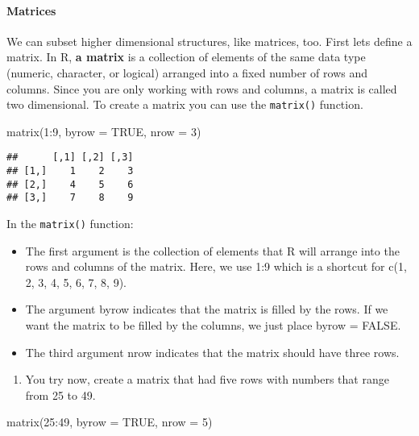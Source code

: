 \documentclass[
]{article}
\newenvironment{Shaded}{\begin{snugshade}}{\end{snugshade}}
\newcommand{\AttributeTok}[1]{\textcolor[rgb]{0.77,0.63,0.00}{#1}}
\newcommand{\ConstantTok}[1]{\textcolor[rgb]{0.00,0.00,0.00}{#1}}
\newcommand{\DecValTok}[1]{\textcolor[rgb]{0.00,0.00,0.81}{#1}}
\newcommand{\FunctionTok}[1]{\textcolor[rgb]{0.00,0.00,0.00}{#1}}
\newcommand{\NormalTok}[1]{#1}
\newcommand{\SpecialCharTok}[1]{\textcolor[rgb]{0.00,0.00,0.00}{#1}}
\providecommand{\tightlist}{%
  \setlength{\itemsep}{0pt}\setlength{\parskip}{0pt}}
\begin{document}
\hypertarget{matrices}{%
\paragraph{Matrices}\label{matrices}}

We can subset higher dimensional structures, like matrices, too. First
lets define a matrix. In R, \textbf{a matrix} is a collection of
elements of the same data type (numeric, character, or logical) arranged
into a fixed number of rows and columns. Since you are only working with
rows and columns, a matrix is called two dimensional. To create a matrix
you can use the \texttt{matrix()} function.

\begin{Shaded}
\begin{Highlighting}[]
\FunctionTok{matrix}\NormalTok{(}\DecValTok{1}\SpecialCharTok{:}\DecValTok{9}\NormalTok{, }\AttributeTok{byrow =} \ConstantTok{TRUE}\NormalTok{, }\AttributeTok{nrow =} \DecValTok{3}\NormalTok{)}
\end{Highlighting}
\end{Shaded}

\begin{verbatim}
##      [,1] [,2] [,3]
## [1,]    1    2    3
## [2,]    4    5    6
## [3,]    7    8    9
\end{verbatim}

In the \texttt{matrix()} function:

\begin{itemize}
\tightlist
\item
  The first argument is the collection of elements that R will arrange
  into the rows and columns of the matrix. Here, we use 1:9 which is a
  shortcut for c(1, 2, 3, 4, 5, 6, 7, 8, 9).
\item
  The argument byrow indicates that the matrix is filled by the rows. If
  we want the matrix to be filled by the columns, we just place byrow =
  FALSE.
\item
  The third argument nrow indicates that the matrix should have three
  rows.
\end{itemize}

\begin{enumerate}
\def\labelenumi{(\arabic{enumi})}
\setcounter{enumi}{4}
\tightlist
\item
  You try now, create a matrix that had five rows with numbers that
  range from 25 to 49.
\end{enumerate}

\begin{Shaded}
\begin{Highlighting}[]
\FunctionTok{matrix}\NormalTok{(}\DecValTok{25}\SpecialCharTok{:}\DecValTok{49}\NormalTok{, }\AttributeTok{byrow =} \ConstantTok{TRUE}\NormalTok{, }\AttributeTok{nrow =} \DecValTok{5}\NormalTok{)}
\end{Highlighting}
\end{Shaded}
\end{document}
